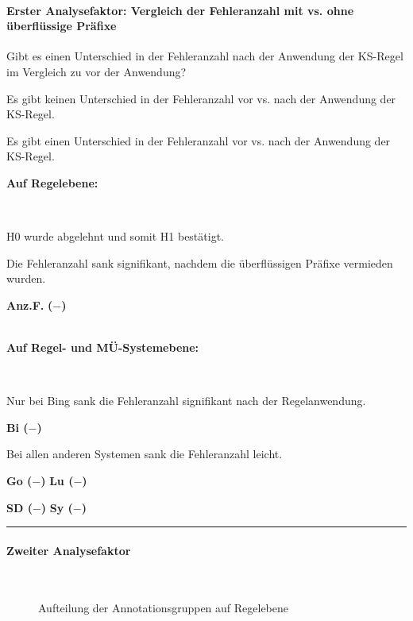 
\paragraph*{Erster Analysefaktor: Vergleich der Fehleranzahl mit vs. ohne überflüssige Präfixe}
\begin{description}[font=\normalfont\bfseries]
\item [Fragestellung:] Gibt es einen Unterschied in der Fehleranzahl nach der Anwendung der KS-Regel im Vergleich zu vor der Anwendung?
\item [H0 --] Es gibt keinen Unterschied in der Fehleranzahl vor vs. nach der Anwendung der KS-Regel.
\item [H1 --] Es gibt einen Unterschied in der Fehleranzahl vor vs. nach der Anwendung der KS-Regel.
\item [Resultat]
\end{description}
\noindent
\parbox[t]{.75\textwidth}{\textbf{Auf Regelebene:}}\\
\parbox[t]{.75\textwidth}{H0 wurde abgelehnt und somit H1 bestätigt.

Die Fehleranzahl sank signifikant, nachdem die überflüssigen Präfixe vermieden wurden.}
\parbox[t]{.04\textwidth}{}
\colorbox{smGreen}{\parbox[t]{.2\textwidth}{
{ \textbf{Anz.F.}} \textbf{($-$)}\\
\\
}}

\noindent
\parbox[t]{.75\textwidth}{\textbf{Auf Regel- und MÜ-Systemebene:}}\\
\parbox[t]{.75\textwidth}{
Nur bei Bing sank die Fehleranzahl signifikant nach der Regelanwendung.
}
\parbox[t]{.04\textwidth}{}
\colorbox{smGreen}{\parbox[t]{.2\textwidth}{
\textbf{Bi ($-$)}\\
}}

\medskip
\noindent
\parbox[t]{.75\textwidth}{
Bei allen anderen Systemen sank die Fehleranzahl leicht.
}
\parbox[t]{.04\textwidth}{}
\parbox[t]{.2\textwidth}{
{ \textbf{Go ($-$)}}{ \textbf{Lu ($-$)}}

{ \textbf{SD ($-$)}} \textbf{Sy ($-$)}
}

\hrule
\paragraph*{Zweiter Analysefaktor}\hfill\\
\begin{figure}
\caption{Aufteilung der Annotationsgruppen auf Regelebene}
\end{figure}

